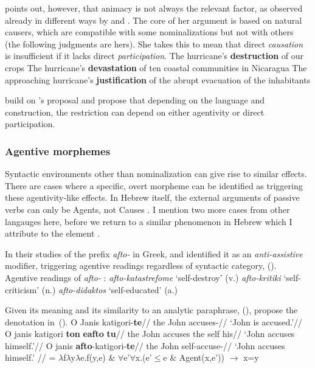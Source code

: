 {\cite{sichel10n} points out, however, that animacy is not always the relevant factor, as observed already in different ways by \cite{pesetsky95} and \cite{marantz97}. The core of her argument is based on natural causers, which are compatible with some nominalizations but not with others (the following judgments are hers). She takes this to mean that direct \emph{causation} is insufficient if it lacks direct \emph{participation}.
\pex
	\a The hurricane's \textbf{destruction} of our crops
	\a The hurricane's \textbf{devastation} of ten coastal communities in Nicaragua
\xe
\ex \ljudge{\#} The approaching hurricane's \textbf{justification} of the abrupt evacuation of the inhabitants
\xe

\cite{alexiadouetal13,alexiadouetal13jcgl} build on \citeauthor{sichel10n}'s proposal and propose that depending on the language and construction, the restriction can depend on either agentivity or direct participation.

		\subsubsection{Agentive morphemes}
Syntactic environments other than nominalization can give rise to similar effects. There are cases where a specific, overt morpheme can be identified as triggering these agentivity-like effects. In Hebrew itself, the external arguments of passive verbs can only be Agents, not Causes \citep{doron03}. I mention two more cases from other langauges here, before we return to a similar phenomenon in Hebrew which I attribute to the element {\va}.

In their studies of the prefix \emph{afto-} in Greek, \cite{alexiadouafto} and \cite{spathasetal15} identified it as an \emph{anti-assistive} modifier, triggering agentive readings regardless of syntactic category, (\nextx).
\pex Agentive readings of \emph{afto-} \citep[61]{alexiadouafto}:
	\a \emph{afto-katastrefome} `self-destroy' (v.)
	\a \emph{afto-kritiki} `self-criticism' (n.)
	\a \emph{afto-didaktos} `self-educated' (a.)
\xe

Given its meaning and its similarity to an analytic paraphrase, (\nextx), \cite{spathasetal15} propose the denotation in~(\anextx).
\pex
	\a \begingl
		\gla O Janis katigori-\textbf{te}//
		\glb the John accuses-//
		\glft `John is accused.'//
	\endgl
	\a \begingl
		\gla O janis katigori \textbf{ton} \textbf{eafto} \textbf{tu}//
		\glb the John accuses the self his//
		\glft `John accuses himself.'//
	\endgl
	\a \begingl
		\gla O janis \textbf{afto}-katigori-\textbf{te}//
		\glb the John self-accuse-//
		\glft `John accuses himself.' //
	\endgl
\xe
\ex {} = $\lambda$f$\lambda$y$\lambda$e.f(y,e) \& $\forall$e'$\forall$x.(e'$\le$e \& Agent(x,e')) $\rightarrow$ x=y 
\xe

}
